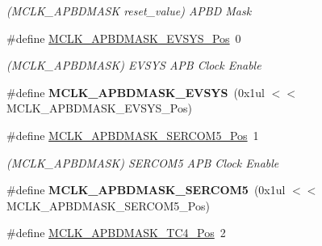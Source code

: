 \begin{DoxyCompactItemize}
\begin{DoxyCompactList}\small\item\em (M\+C\+L\+K\+\_\+\+A\+P\+B\+D\+M\+A\+S\+K reset\+\_\+value) A\+P\+B\+D Mask \end{DoxyCompactList}\item 
\hypertarget{group___s_a_m_l21___m_c_l_k_ga910bc2de1962da4cbea78c349a2f2b7e}{}\#define \hyperlink{group___s_a_m_l21___m_c_l_k_ga910bc2de1962da4cbea78c349a2f2b7e}{M\+C\+L\+K\+\_\+\+A\+P\+B\+D\+M\+A\+S\+K\+\_\+\+E\+V\+S\+Y\+S\+\_\+\+Pos}~0\label{group___s_a_m_l21___m_c_l_k_ga910bc2de1962da4cbea78c349a2f2b7e}

\begin{DoxyCompactList}\small\item\em (M\+C\+L\+K\+\_\+\+A\+P\+B\+D\+M\+A\+S\+K) E\+V\+S\+Y\+S A\+P\+B Clock Enable \end{DoxyCompactList}\item 
\hypertarget{group___s_a_m_l21___m_c_l_k_ga826a7d1fcf9eee631511c46344039c7d}{}\#define {\bfseries M\+C\+L\+K\+\_\+\+A\+P\+B\+D\+M\+A\+S\+K\+\_\+\+E\+V\+S\+Y\+S}~(0x1ul $<$$<$ M\+C\+L\+K\+\_\+\+A\+P\+B\+D\+M\+A\+S\+K\+\_\+\+E\+V\+S\+Y\+S\+\_\+\+Pos)\label{group___s_a_m_l21___m_c_l_k_ga826a7d1fcf9eee631511c46344039c7d}

\item 
\hypertarget{group___s_a_m_l21___m_c_l_k_ga0860f3d77409f156d996a776493af3a9}{}\#define \hyperlink{group___s_a_m_l21___m_c_l_k_ga0860f3d77409f156d996a776493af3a9}{M\+C\+L\+K\+\_\+\+A\+P\+B\+D\+M\+A\+S\+K\+\_\+\+S\+E\+R\+C\+O\+M5\+\_\+\+Pos}~1\label{group___s_a_m_l21___m_c_l_k_ga0860f3d77409f156d996a776493af3a9}

\begin{DoxyCompactList}\small\item\em (M\+C\+L\+K\+\_\+\+A\+P\+B\+D\+M\+A\+S\+K) S\+E\+R\+C\+O\+M5 A\+P\+B Clock Enable \end{DoxyCompactList}\item 
\hypertarget{group___s_a_m_l21___m_c_l_k_ga1fe54d279cd69d48baff8dfd429f3169}{}\#define {\bfseries M\+C\+L\+K\+\_\+\+A\+P\+B\+D\+M\+A\+S\+K\+\_\+\+S\+E\+R\+C\+O\+M5}~(0x1ul $<$$<$ M\+C\+L\+K\+\_\+\+A\+P\+B\+D\+M\+A\+S\+K\+\_\+\+S\+E\+R\+C\+O\+M5\+\_\+\+Pos)\label{group___s_a_m_l21___m_c_l_k_ga1fe54d279cd69d48baff8dfd429f3169}

\item 
\hypertarget{group___s_a_m_l21___m_c_l_k_ga7d13025b086bcd8480dbf86f5f1b777f}{}\#define \hyperlink{group___s_a_m_l21___m_c_l_k_ga7d13025b086bcd8480dbf86f5f1b777f}{M\+C\+L\+K\+\_\+\+A\+P\+B\+D\+M\+A\+S\+K\+\_\+\+T\+C4\+\_\+\+Pos}~2\label{group___s_a_m_l21___m_c_l_k_ga7d13025b086bcd8480dbf86f5f1b777f}


\end{DoxyCompactItemize}
